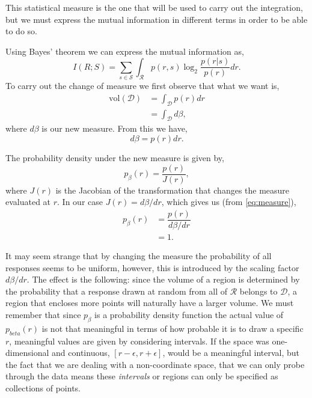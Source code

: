 \documentclass[10pt,a4paper]{book}
\begin{document}
This statistical measure is the one that will be used to carry out the integration, but we must express the mutual information in different terms in order to be able to do so.

Using Bayes' theorem we can express the mutual information as,
\begin{equation} \label{eq:mi_bayes}
I(R;S) = \sum_{s \in \mathcal{S}} \int_{\mathcal{R}} p(r,s) \log_2 \dfrac{p(r|s)}{p(r)}dr.
\end{equation}
%
To carry out the change of measure we first observe that what we want is,
\begin{align}
\text{vol}(\mathcal{D})& = \int_{\mathcal{D}} p(r) dr \nonumber \\
& = \int_{\mathcal{D}} d\beta ,
\end{align}
where $d\beta$ is our new measure. From this we have,
\begin{equation} \label{eq:measure}
d\beta = p(r)dr.
\end{equation}

The probability density under the new measure is given by,
\begin{equation}
p_{\beta}(r) = \dfrac{p(r)}{J(r)},
\end{equation}
where $J(r)$ is the Jacobian of the transformation that changes the measure evaluated at $r$. In our case $J(r) = d\beta / dr$, which gives us (from \ref{eq:measure}),
\begin{align}
p_{\beta}(r) & = \dfrac{p(r)}{d\beta / dr} \nonumber \\
& = 1.
\end{align}

It may seem strange that by changing the measure the probability of all responses seems to be uniform, however, this is introduced by the scaling factor $d\beta/dr$. The effect is the following: since the volume of a region is determined by the probability that a response drawn at random from all of $\mathcal{R}$ belongs to $\mathcal{D}$, a region that encloses more points will naturally have a larger volume. We must remember that since $p_{\beta}$ is a probability density function the actual value of $p_{beta}(r)$ is not that meaningful in terms of how probable it is to draw a specific $r$, meaningful values are given by considering intervals. If the space was one-dimensional and continuous, $[r -\epsilon, r + \epsilon]$, would be a meaningful interval, but the fact that we are dealing with a non-coordinate space, that we can only probe through the data means these \emph{intervals} or regions can only be specified as collections of points.
\end{document}
